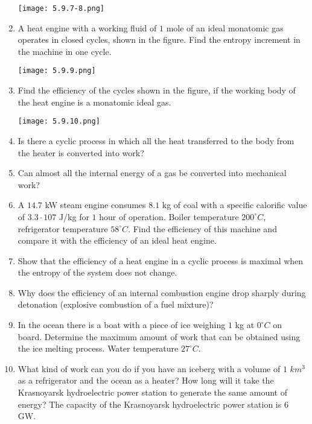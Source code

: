 \documentclass{article}
\begin{document}
\begin{enumerate}[label=5.9.\arabic*]
\begin{center}
    \texttt{[image: 5.9.7-8.png]}
\end{center}

\item A heat engine with a working fluid of $1$ mole of an ideal monatomic gas operates in closed cycles, shown in the figure. Find the entropy increment in the machine in one cycle.

\begin{center}
    \texttt{[image: 5.9.9.png]}
\end{center}

\item Find the efficiency of the cycles shown in the figure, if the working body of the heat engine is a monatomic ideal gas.

\begin{center}
    \texttt{[image: 5.9.10.png]}
\end{center}

\item Is there a cyclic process in which all the heat transferred to the body from the heater is converted into work?

\item Can almost all the internal energy of a gas be converted into mechanical work?

\item A $14.7$ kW steam engine consumes $8.1$ kg of coal with a specific calorific value of $3.3 \cdot 107$ J/kg for $1$ hour of operation. Boiler temperature $200^\circ C$, refrigerator temperature $58^\circ C$. Find the efficiency of this machine and compare it with the efficiency of an ideal heat engine.

\item Show that the efficiency of a heat engine in a cyclic process is maximal when the entropy of the system does not change.

\item Why does the efficiency of an internal combustion engine drop sharply during detonation (explosive combustion of a fuel mixture)?

\item In the ocean there is a boat with a piece of ice weighing $1$ kg at $0^\circ C$ on board. Determine the maximum amount of work that can be obtained using the ice melting process. Water temperature $27^\circ C$.

\item What kind of work can you do if you have an iceberg with a volume of $1$ $km^3$ as a refrigerator and the ocean as a heater? How long will it take the Krasnoyarsk hydroelectric power station to generate the same amount of energy? The capacity of the Krasnoyarsk hydroelectric power station is $6$ GW.


\end{enumerate}
\end{document}

